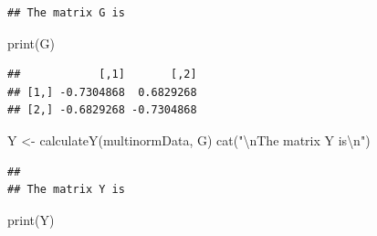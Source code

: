 \documentclass[
]{article}
\newenvironment{Shaded}{\begin{snugshade}}{\end{snugshade}}
\newcommand{\FunctionTok}[1]{\textcolor[rgb]{0.00,0.00,0.00}{#1}}
\newcommand{\NormalTok}[1]{#1}
\newcommand{\OtherTok}[1]{\textcolor[rgb]{0.56,0.35,0.01}{#1}}
\newcommand{\SpecialCharTok}[1]{\textcolor[rgb]{0.00,0.00,0.00}{#1}}
\newcommand{\StringTok}[1]{\textcolor[rgb]{0.31,0.60,0.02}{#1}}
\begin{document}
\begin{verbatim}
## The matrix G is
\end{verbatim}

\begin{Shaded}
\begin{Highlighting}[]
\FunctionTok{print}\NormalTok{(G)}
\end{Highlighting}
\end{Shaded}

\begin{verbatim}
##            [,1]       [,2]
## [1,] -0.7304868  0.6829268
## [2,] -0.6829268 -0.7304868
\end{verbatim}

\begin{Shaded}
\begin{Highlighting}[]
\NormalTok{Y }\OtherTok{\textless{}{-}} \FunctionTok{calculateY}\NormalTok{(multinormData, G)}
\FunctionTok{cat}\NormalTok{(}\StringTok{"}\SpecialCharTok{\textbackslash{}n}\StringTok{The matrix Y is}\SpecialCharTok{\textbackslash{}n}\StringTok{"}\NormalTok{)}
\end{Highlighting}
\end{Shaded}

\begin{verbatim}
## 
## The matrix Y is
\end{verbatim}

\begin{Shaded}
\begin{Highlighting}[]
\FunctionTok{print}\NormalTok{(Y)}
\end{Highlighting}
\end{Shaded}
\end{document}
